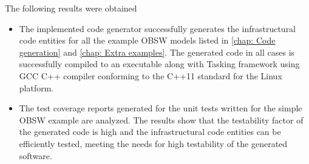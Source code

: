 The following results were obtained 
\begin{itemize}
\item  The implemented code generator successfully generates the infrastructural code entities for all the example OBSW models listed in \cref{chap: Code generation} and \cref{chap: Extra examples}. The generated code in all cases is successfully compiled to an executable along with Tasking framework using GCC C++ compiler conforming to the C++11 standard for the Linux platform.
\item The test coverage reports generated for the unit tests written for the simple OBSW example are analyzed. The results show that the testability factor of the generated code is high and the infrastructural code entities can be efficiently tested, meeting the needs for high testability of the generated software.      
\end{itemize}

